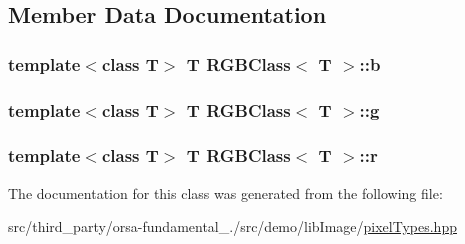 \subsection{Member Data Documentation}
\hypertarget{classRGBClass_ab4a4a45fcf88c5a47c051090eb7625c9}{}
\subsubsection[{b}]{\setlength{\rightskip}{0pt plus 5cm}template$<$class T$>$ T {\bf R\+G\+B\+Class}$<$ T $>$\+::b}\label{classRGBClass_ab4a4a45fcf88c5a47c051090eb7625c9}
\hypertarget{classRGBClass_a4e39bdb746f3651ee1598b4c28eaf94f}{}
\subsubsection[{g}]{\setlength{\rightskip}{0pt plus 5cm}template$<$class T$>$ T {\bf R\+G\+B\+Class}$<$ T $>$\+::g}\label{classRGBClass_a4e39bdb746f3651ee1598b4c28eaf94f}
\hypertarget{classRGBClass_a4f0ef7e4d6139ec481357bfd4c39e33b}{}
\subsubsection[{r}]{\setlength{\rightskip}{0pt plus 5cm}template$<$class T$>$ T {\bf R\+G\+B\+Class}$<$ T $>$\+::r}\label{classRGBClass_a4f0ef7e4d6139ec481357bfd4c39e33b}


The documentation for this class was generated from the following file\+:\begin{DoxyCompactItemize}
\item 
src/third\+\_\+party/orsa-\/fundamental\+\_./src/demo/lib\+Image/\hyperlink{pixelTypes_8hpp}{pixel\+Types.\+hpp}\end{DoxyCompactItemize}
